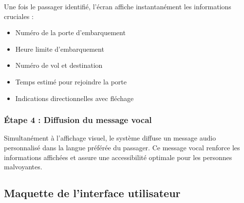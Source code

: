 \documentclass[12pt,a4paper]{article}
\begin{document}
Une fois le passager identifié, l'écran affiche instantanément les informations cruciales :

\begin{itemize}
\item Numéro de la porte d'embarquement
\item Heure limite d'embarquement
\item Numéro de vol et destination
\item Temps estimé pour rejoindre la porte
\item Indications directionnelles avec fléchage
\end{itemize}

\subsubsection{Étape 4 : Diffusion du message vocal}

Simultanément à l'affichage visuel, le système diffuse un message audio personnalisé dans la langue préférée du passager. Ce message vocal renforce les informations affichées et assure une accessibilité optimale pour les personnes malvoyantes.

\subsection{Maquette de l'interface utilisateur}
\end{document}
